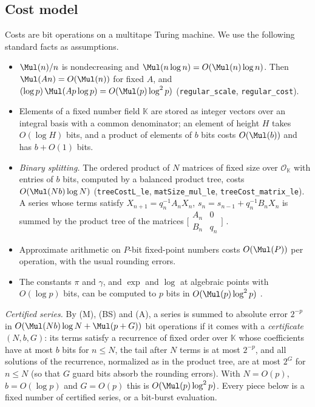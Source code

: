 \begin{small}

\subsection{Cost model}\label{app:tools}
Costs are bit operations on a multitape Turing machine. We use the following standard facts as assumptions.
\begin{itemize}
\item[(M)] $\Mul(n)/n$ is nondecreasing and $\Mul(n\log n) = O(\Mul(n)\log n)$. Then $\Mul(An) = O(\Mul(n))$ for fixed
$A$, and $(\log p)\,\Mul(Ap\log p) = O(\Mul(p)\log^2p)$ (\nolinkurl{regular_scale}, \nolinkurl{regular_cost}).
\item[(K)] Elements of a fixed number field $\mathbb K$ are stored as integer vectors over an integral basis with a
common denominator; an element of height $H$ takes $O(\log H)$ bits, and a product of elements of $b$ bits costs
$O(\Mul(b))$ and has $b + O(1)$ bits.
\item[(BS)] \emph{Binary splitting.} The ordered product of $N$ matrices of fixed size over $\mathcal O_{\mathbb K}$
with entries of $b$ bits, computed by a balanced product tree, costs $O(\Mul(Nb)\log N)$
(\nolinkurl{treeCostL_le}, \nolinkurl{matSize_mul_le}, \nolinkurl{treeCost_matrix_le}). A series whose terms satisfy
$X_{n+1} = q_n^{-1}A_nX_n$, $s_n = s_{n-1} + q_n^{-1}B_nX_n$ is summed by the product tree of the matrices
$\bigl[\begin{smallmatrix}A_n & 0\\ B_n & q_n\end{smallmatrix}\bigr]$ \cite{HP98}.
\item[(A)] Approximate arithmetic on $P$-bit fixed-point numbers costs $O(\Mul(P))$ per operation, with the usual
rounding errors.
\item[(E)] The constants $\pi$ and $\gamma$, and $\exp$ and $\log$ at algebraic points with $O(\log p)$ bits, can be
computed to $p$ bits in $O(\Mul(p)\log^2p)$ \cite{BM80,HP98,BZ10}.
\end{itemize}

\emph{Certified series.} By (M), (BS) and (A), a series is summed to absolute error $2^{-p}$ in
$O(\Mul(Nb)\log N + \Mul(p+G))$ bit operations if it comes with a \emph{certificate} $(N, b, G)$: its terms satisfy a
recurrence of fixed order over $\mathbb K$ whose coefficients have at most $b$ bits for $n \le N$, the tail after $N$
terms is at most $2^{-p}$, and all solutions of the recurrence, normalized as in the product tree, are at most $2^G$
for $n \le N$ (so that $G$ guard bits absorb the rounding errors). With $N = O(p)$, $b = O(\log p)$ and $G = O(p)$
this is $O(\Mul(p)\log^2p)$. Every piece below is a fixed number of certified series, or a bit-burst evaluation.


\end{small}
